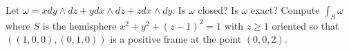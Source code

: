 Let $\omega= x dy\wedge dz+y dx\wedge dz+z dx\wedge dy$. Is $\omega$
closed? Is $\omega$ exact? Compute $\int_S\omega$ where $S$ is the
hemisphere $x^2+y^2+(z-1)^2=1$ with $z\geq 1$ oriented so that
$((1,0,0),(0,1,0))$ is a positive frame at the point $(0,0,2)$. 
